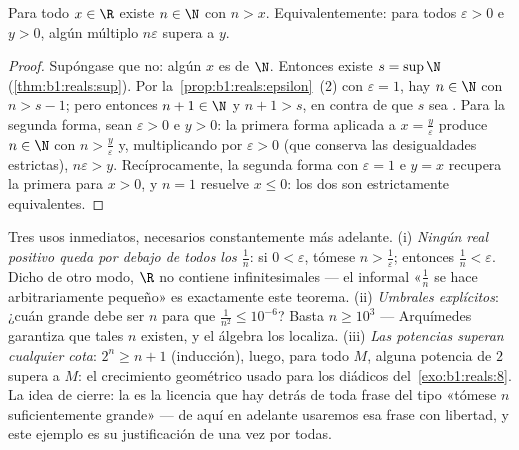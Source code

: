 \begin{theorem}\label{thm:b1:reals:archimedes}
Para todo $x \in \R$ existe $n \in \N$ con $n > x$. Equivalentemente:
para todos $\varepsilon > 0$ e $y > 0$, algún múltiplo $n\varepsilon$
supera a $y$.
\end{theorem}

\begin{proof}
Supóngase que no: algún $x$ es  de $\N$. Entonces existe
$s = \sup \N$ (\cref{thm:b1:reals:sup}). Por
la~\cref{prop:b1:reals:epsilon}~(2) con $\varepsilon = 1$, hay
$n \in \N$ con $n > s - 1$; pero entonces $n + 1 \in \N$ y $n + 1 > s$,
en contra de que $s$ sea . Para la segunda forma, sean
$\varepsilon > 0$ e $y > 0$: la primera forma aplicada a
$x = \frac{y}{\varepsilon}$ produce $n \in \N$ con
$n > \frac{y}{\varepsilon}$ y, multiplicando por $\varepsilon > 0$
(que conserva las desigualdades estrictas), $n\varepsilon > y$.
Recíprocamente, la segunda forma con $\varepsilon = 1$ e $y = x$
recupera la primera para $x > 0$, y $n = 1$ resuelve $x \leq 0$: los
dos  son estrictamente equivalentes.
\end{proof}

\begin{example}\label{ex:b1:reals:archimedeswork}
Tres usos inmediatos, necesarios constantemente más adelante. (i)
\emph{Ningún real positivo queda por debajo de todos los $\frac1n$}:
si $0 < \varepsilon$, tómese $n > \frac1\varepsilon$; entonces
$\frac1n < \varepsilon$. Dicho de otro modo, $\R$ no contiene
infinitesimales --- el informal «$\frac1n$ se hace arbitrariamente
pequeño» es exactamente este teorema. (ii) \emph{Umbrales explícitos}:
¿cuán grande debe ser $n$ para que $\frac{1}{n^2} \leq 10^{-6}$? Basta
$n \geq 10^3$ --- Arquímedes garantiza que tales $n$ existen, y el
álgebra los localiza. (iii) \emph{Las potencias superan cualquier
cota}: $2^n \geq n + 1$ (inducción), luego, para todo $M$, alguna
potencia de $2$ supera a $M$: el crecimiento geométrico usado para los
diádicos del~\cref{exo:b1:reals:8}. La idea de cierre: la
 es la licencia que hay detrás de toda frase
del tipo «tómese $n$ suficientemente grande» --- de aquí en adelante
usaremos esa frase con libertad, y este ejemplo es su justificación de
una vez por todas.
\end{example}

